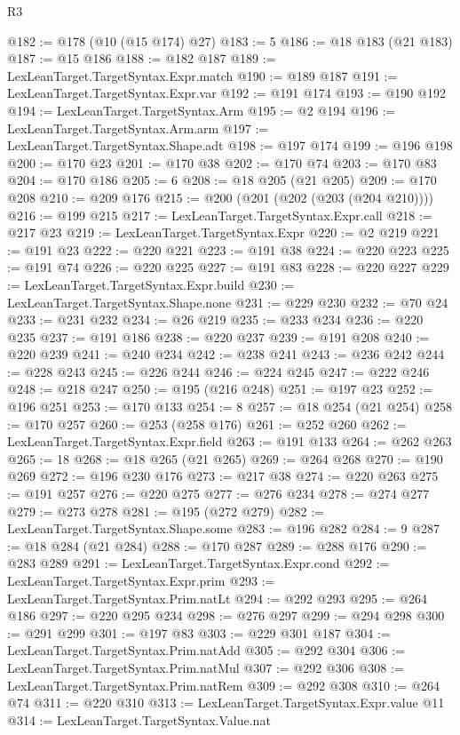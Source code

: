\begin{lexlean}{R3}
\begin{coremodule}
@182 := @178 (@10 (@15 @174) @27)
@183 := 5
@186 := @18 @183 (@21 @183)
@187 := @15 @186
@188 := @182 @187
@189 := LexLeanTarget.TargetSyntax.Expr.match
@190 := @189 @187
@191 := LexLeanTarget.TargetSyntax.Expr.var
@192 := @191 @174
@193 := @190 @192
@194 := LexLeanTarget.TargetSyntax.Arm
@195 := @2 @194
@196 := LexLeanTarget.TargetSyntax.Arm.arm
@197 := LexLeanTarget.TargetSyntax.Shape.adt
@198 := @197 @174
@199 := @196 @198
@200 := @170 @23
@201 := @170 @38
@202 := @170 @74
@203 := @170 @83
@204 := @170 @186
@205 := 6
@208 := @18 @205 (@21 @205)
@209 := @170 @208
@210 := @209 @176
@215 := @200 (@201 (@202 (@203 (@204 @210))))
@216 := @199 @215
@217 := LexLeanTarget.TargetSyntax.Expr.call
@218 := @217 @23
@219 := LexLeanTarget.TargetSyntax.Expr
@220 := @2 @219
@221 := @191 @23
@222 := @220 @221
@223 := @191 @38
@224 := @220 @223
@225 := @191 @74
@226 := @220 @225
@227 := @191 @83
@228 := @220 @227
@229 := LexLeanTarget.TargetSyntax.Expr.build
@230 := LexLeanTarget.TargetSyntax.Shape.none
@231 := @229 @230
@232 := @70 @24
@233 := @231 @232
@234 := @26 @219
@235 := @233 @234
@236 := @220 @235
@237 := @191 @186
@238 := @220 @237
@239 := @191 @208
@240 := @220 @239
@241 := @240 @234
@242 := @238 @241
@243 := @236 @242
@244 := @228 @243
@245 := @226 @244
@246 := @224 @245
@247 := @222 @246
@248 := @218 @247
@250 := @195 (@216 @248)
@251 := @197 @23
@252 := @196 @251
@253 := @170 @133
@254 := 8
@257 := @18 @254 (@21 @254)
@258 := @170 @257
@260 := @253 (@258 @176)
@261 := @252 @260
@262 := LexLeanTarget.TargetSyntax.Expr.field
@263 := @191 @133
@264 := @262 @263
@265 := 18
@268 := @18 @265 (@21 @265)
@269 := @264 @268
@270 := @190 @269
@272 := @196 @230 @176
@273 := @217 @38
@274 := @220 @263
@275 := @191 @257
@276 := @220 @275
@277 := @276 @234
@278 := @274 @277
@279 := @273 @278
@281 := @195 (@272 @279)
@282 := LexLeanTarget.TargetSyntax.Shape.some
@283 := @196 @282
@284 := 9
@287 := @18 @284 (@21 @284)
@288 := @170 @287
@289 := @288 @176
@290 := @283 @289
@291 := LexLeanTarget.TargetSyntax.Expr.cond
@292 := LexLeanTarget.TargetSyntax.Expr.prim
@293 := LexLeanTarget.TargetSyntax.Prim.natLt
@294 := @292 @293
@295 := @264 @186
@297 := @220 @295 @234
@298 := @276 @297
@299 := @294 @298
@300 := @291 @299
@301 := @197 @83
@303 := @229 @301 @187
@304 := LexLeanTarget.TargetSyntax.Prim.natAdd
@305 := @292 @304
@306 := LexLeanTarget.TargetSyntax.Prim.natMul
@307 := @292 @306
@308 := LexLeanTarget.TargetSyntax.Prim.natRem
@309 := @292 @308
@310 := @264 @74
@311 := @220 @310
@313 := LexLeanTarget.TargetSyntax.Expr.value @11
@314 := LexLeanTarget.TargetSyntax.Value.nat

\end{coremodule}
\end{lexlean}
